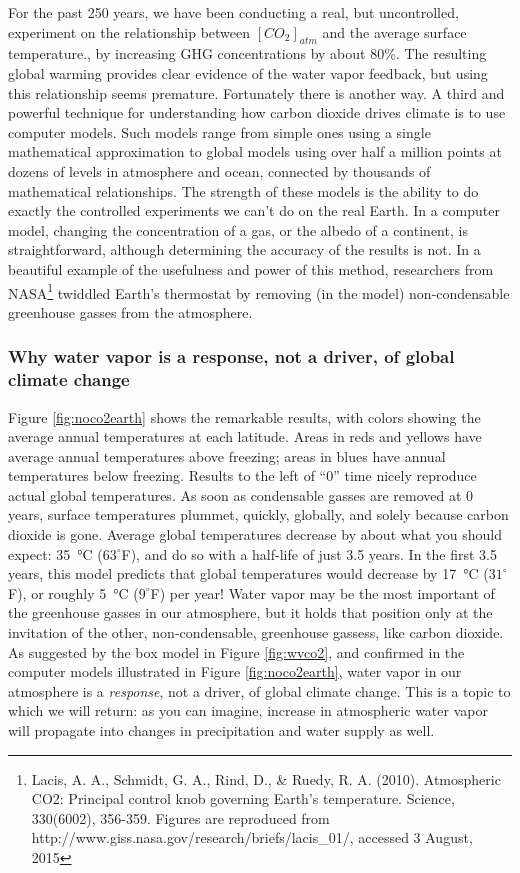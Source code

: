 For the past 250 years, we have been conducting a real, but uncontrolled, experiment on the relationship between $[CO_2]_{atm}$ and the average surface temperature., by increasing GHG concentrations by about 80\%. The resulting global warming provides clear evidence of the water vapor feedback, but using this relationship seems premature. Fortunately there is another way. A third and powerful technique for understanding how carbon dioxide drives climate is to use computer models. Such models range from simple ones using a single mathematical approximation to global models using over half a million points at dozens of levels in atmosphere and ocean, connected by thousands of mathematical relationships. The strength of these models is the ability to do exactly the controlled experiments we can't do on the real Earth. In a computer model, changing the concentration of a gas, or the albedo of a continent, is straightforward, although determining the accuracy of the results is not. In a beautiful example of the usefulness and power of this method, researchers from NASA\footnote{Lacis, A. A., Schmidt, G. A., Rind, D., \& Ruedy, R. A. (2010). Atmospheric CO2: Principal control knob governing Earth's temperature. Science, 330(6002), 356-359. Figures are reproduced from http://www.giss.nasa.gov/research/briefs/lacis\_01/, accessed 3 August, 2015} twiddled Earth's thermostat by removing (in the model) non-condensable greenhouse gasses from the atmosphere. 

\subsubsection{Why water vapor is a response, not a driver, of global climate change}
Figure \ref{fig:noco2earth} shows the remarkable results, with colors showing the average annual temperatures at each latitude. Areas in reds and yellows have average annual temperatures above freezing; areas in blues have annual temperatures below freezing. Results to the left of ``0'' time nicely reproduce actual global temperatures.  As soon as condensable gasses are removed at 0 years, surface temperatures plummet, quickly, globally, and solely because carbon dioxide is gone. Average global temperatures decrease by about what you should expect: \SI{35}{\celsius} ($63^{\circ}$F), and do so with a half-life of just 3.5 years. In the first 3.5 years, this model predicts that global temperatures would decrease by \SI{17}{\celsius} ($31^{\circ}$F), or roughly \SI{5}{\celsius} ($9^{\circ}$F) per year! Water vapor may be the most important of the greenhouse gasses in our atmosphere, but it holds that position only at the invitation of the other, non-condensable, greenhouse gassess, like carbon dioxide. As suggested by the box model in Figure \ref{fig:wvco2}, and confirmed in the computer models illustrated in Figure \ref{fig:noco2earth}, water vapor in our atmosphere is a \emph{response}, not a driver, of global climate change. This is a topic to which we will return: as you can imagine, increase in atmospheric water vapor will propagate into changes in precipitation and water supply as well. 

